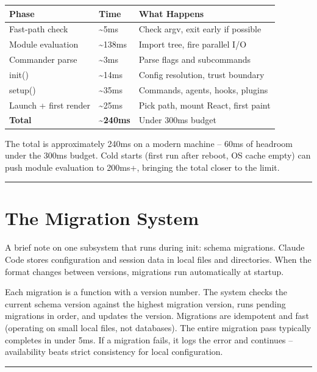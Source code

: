 \documentclass[
  english,
  11pt,
  letterpaper,
]{book}
\begin{document}
\begin{longtable}[]{@{}lll@{}}
\toprule\noalign{}
Phase & Time & What Happens \\
\midrule\noalign{}
\endhead
\bottomrule\noalign{}
\endlastfoot
Fast-path check & \textasciitilde5ms & Check argv, exit early if
possible \\
Module evaluation & \textasciitilde138ms & Import tree, fire parallel
I/O \\
Commander parse & \textasciitilde3ms & Parse flags and subcommands \\
init() & \textasciitilde14ms & Config resolution, trust boundary \\
setup() & \textasciitilde35ms & Commands, agents, hooks, plugins \\
Launch + first render & \textasciitilde25ms & Pick path, mount React,
first paint \\
\textbf{Total} & \textbf{\textasciitilde240ms} & Under 300ms budget \\
\end{longtable}

The total is approximately 240ms on a modern machine -- 60ms of headroom
under the 300ms budget. Cold starts (first run after reboot, OS cache
empty) can push module evaluation to 200ms+, bringing the total closer
to the limit.

\begin{center}\rule{0.5\linewidth}{0.5pt}\end{center}

\section{The Migration System}\label{the-migration-system}

A brief note on one subsystem that runs during init: schema migrations.
Claude Code stores configuration and session data in local files and
directories. When the format changes between versions, migrations run
automatically at startup.

Each migration is a function with a version number. The system checks
the current schema version against the highest migration version, runs
pending migrations in order, and updates the version. Migrations are
idempotent and fast (operating on small local files, not databases). The
entire migration pass typically completes in under 5ms. If a migration
fails, it logs the error and continues -- availability beats strict
consistency for local configuration.

\begin{center}\rule{0.5\linewidth}{0.5pt}\end{center}
\end{document}
